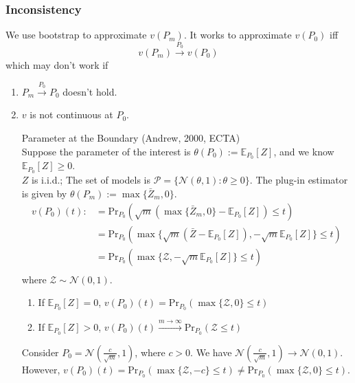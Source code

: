 \documentclass[11pt]{elegantbook}
\begin{document}
\subsubsection*{Inconsistency}
We use bootstrap to approximate $v(P_m)$. It works to approximate $v(P_0)$ iff $$v(P_m) \stackrel{P_0}{\longrightarrow}v(P_0)$$
which may don't work if
\begin{enumerate}
    \item $P_m \stackrel{P_0}{\longrightarrow} P_0$ doesn't hold.
    \item $v$ is not continuous at $P_0$.
    \begin{example}\label{ex:inconsistency1}
        Parameter at the Boundary (Andrew, 2000, ECTA)\\
        Suppose the parameter of the interest is $\theta(P_0):=\mathbb{E}_{P_0}[Z]$, and we know $\mathbb{E}_{P_0}[Z]\geq 0$.\\
        $Z$ is i.i.d.; The set of models is $\mathcal{P}=\{\mathcal{N}(\theta,1):\theta\geq 0\}$. The plug-in estimator is given by $\theta(P_m):=\max\{\bar{Z}_m,0\}$.
        \begin{equation}
            \begin{aligned}
                v(P_0)(t):&=\text{Pr}_{P_0}\left(\sqrt{m}\left(\max\{\bar{Z}_m,0\}-\mathbb{E}_{P_0}[Z]\right)\leq t\right)\\
                &=\text{Pr}_{P_0}\left(\max\{\sqrt{m}(\bar{Z}-\mathbb{E}_{P_0}[Z]),-\sqrt{m}\mathbb{E}_{P_0}[Z]\}\leq t\right)\\
                &=\text{Pr}_{P_0}\left(\max\{\mathcal{Z},-\sqrt{m}\mathbb{E}_{P_0}[Z]\}\leq t\right)\\
            \end{aligned}
            \nonumber
        \end{equation}
        where $\mathcal{Z}\sim \mathcal{N}(0,1)$.
        \begin{enumerate}
            \item If $\mathbb{E}_{P_0}[Z]=0$, $v(P_0)(t)=\text{Pr}_{P_0}\left(\max\{\mathcal{Z},0\}\leq t\right)$
            \item If $\mathbb{E}_{P_0}[Z]>0$, $v(P_0)(t)\stackrel{m \rightarrow \infty}{\longrightarrow}\text{Pr}_{P_0}\left(\mathcal{Z}\leq t\right)$
        \end{enumerate}
        Consider $P_0=\mathcal{N}\left(\frac{c}{\sqrt{m}},1\right)$, where $c>0$. We have $\mathcal{N}\left(\frac{c}{\sqrt{m}},1\right) \rightarrow \mathcal{N}\left(0,1\right)$. However, $v(P_0)(t)=\text{Pr}_{P_0}\left(\max\{\mathcal{Z},-c\}\leq t\right) \neq \text{Pr}_{P_0}\left(\max\{\mathcal{Z},0\}\leq t\right)$.


\end{example}
\end{enumerate}
\end{document}
